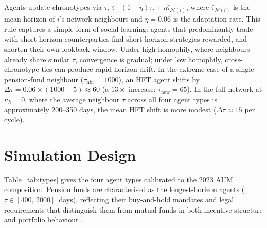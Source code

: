 \documentclass[preprint,12pt,authoryear]{elsarticle}
\begin{document}
Agents update chronotypes via
$\tau_i \leftarrow (1-\eta)\tau_i + \eta\bar{\tau}_{\mathcal{N}(i)}$,
where $\bar{\tau}_{\mathcal{N}(i)}$ is the mean horizon of $i$'s network
neighbours and $\eta = 0.06$ is the adaptation rate.
This rule captures a simple form of social learning: agents that
predominantly trade with short-horizon counterparties find short-horizon
strategies rewarded, and shorten their own lookback window.
Under high homophily, where neighbours already share similar $\tau$,
convergence is gradual; under low homophily, cross-chronotype ties can
produce rapid horizon drift.
In the extreme case of a single pension-fund neighbour ($\tau_{\text{nbr}}=1000$),
an HFT agent shifts by $\Delta\tau = 0.06 \times (1000 - 5) \approx 60$
(a $13\times$ increase: $\tau_{\text{new}} = 65$).
In the full network at $\kappa_h = 0$, where the average neighbour $\tau$
across all four agent types is approximately 200--350 days, the mean HFT
shift is more modest ($\Delta\tau \approx 15$ per cycle).

\section{Simulation Design}
\label{sec:sim}

Table~\ref{tab:types} gives the four agent types calibrated to the 2023
AUM composition.
Pension funds are characterised as the longest-horizon agents ($\tau \in
[400,\,2000]$~days), reflecting their buy-and-hold mandates and legal
requirements that distinguish them from mutual funds in both incentive
structure and portfolio behaviour \citep{delguercio2002}.

\begin{table}[h]
\centering
\caption{Investor types in the CME simulation.
$\tau$ is drawn from a \emph{truncated} log-normal $\mathrm{LN}(\mu,\sigma)$
on the log scale (trading days), acceptance-rejection sampled within the
stated $\tau$ range.}
\label{tab:types}
\end{table}
\end{document}
